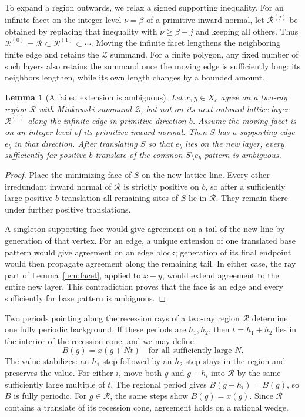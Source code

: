 \documentclass[11pt]{article}
\numberwithin{equation}{section}
\newtheorem{lemma}[theorem]{Lemma}
\theoremstyle{definition}
\theoremstyle{remark}
\newcommand{\ZZ}{\mathcal Z}
\newcommand{\RR}{\mathcal R}
\begin{document}
To expand a region outwards, we relax a signed supporting inequality. For an infinite facet on the
integer level $\nu=\beta$ of a primitive inward normal, let $\RR^{(j)}$ be obtained by replacing
that inequality with $\nu\ge\beta-j$ and keeping all others. Thus
$\RR^{(0)}=\RR\subset\RR^{(1)}\subset\cdots$. Moving the infinite facet lengthens the neighboring
finite edge and retains the $\ZZ$ summand. For a finite polygon, any fixed number of such layers
also retains the summand once the moving edge is sufficiently long: its neighbors lengthen, while
its own length changes by a bounded amount.

\begin{lemma}[A failed extension is ambiguous]\label{lem:boundary-ambiguity}
Let $x,y\in X_c$ agree on a two-ray region $\RR$ with Minkowski summand $\ZZ$, but not on its next
outward lattice layer $\RR^{(1)}$ along the infinite edge in primitive direction $b$. Assume the
moving facet is on an integer level of its primitive inward normal. Then $S$ has a supporting edge
$e_b$ in that direction. After translating $S$ so that $e_b$ lies on the new layer, every
sufficiently far positive $b$-translate of the common $S\setminus e_b$-pattern is ambiguous.
\end{lemma}
\begin{proof}
Place the minimizing face of $S$ on the new lattice line. Every other irredundant inward normal of
$\RR$ is strictly positive on $b$, so after a sufficiently large positive $b$-translation all
remaining sites of $S$ lie in $\RR$. They remain there under further positive translations.

A singleton supporting face would give agreement on a tail of the new line by generation of that
vertex. For an edge, a unique extension of one translated base pattern would give agreement on an
edge block; generation of its final endpoint would then propagate agreement along the remaining
tail. In either case, the ray part of Lemma~\ref{lem:facet}, applied to $x-y$, would extend
agreement to the entire new layer. This contradiction proves that the face is an edge and every
sufficiently far base pattern is ambiguous.
\end{proof}

Two periods pointing along the recession rays of a two-ray region $\RR$ determine one fully periodic
background. If these periods are $h_1,h_2$, then $t=h_1+h_2$ lies in the interior of the recession
cone, and we may define
\begin{equation}\label{eq:background}
 B(g)=x(g+Nt)\quad\text{for all sufficiently large }N.
\end{equation}
The value stabilizes: an $h_1$ step followed by an $h_2$ step stays in the region and preserves the
value. For either $i$, move both $g$ and $g+h_i$ into $\RR$ by the same sufficiently large multiple
of $t$. The regional period gives $B(g+h_i)=B(g)$, so $B$ is fully periodic. For $g\in\RR$, the same
steps show $B(g)=x(g)$. Since $\RR$ contains a translate of its recession cone, agreement holds on a
rational wedge.
\end{document}
